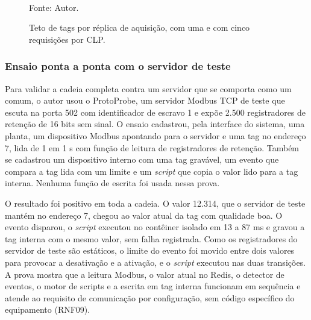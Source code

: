 \begin{figure}[H]
    \centering
    \caption{Teto de tags por réplica de aquisição, com uma e com cinco requisições por CLP.}
    \label{fig:cap7_aquisicao}
    \vspace{0.4cm}
    \vspace{0.2cm} \\
    Fonte: Autor.
\end{figure}

\subsubsection{Ensaio ponta a ponta com o servidor de teste}

\par Para validar a cadeia completa contra um servidor que se comporta como um  comum, o autor usou o ProtoProbe, um servidor Modbus TCP de teste que escuta na porta 502 com identificador de escravo 1 e expõe 2.500 registradores de retenção de 16 bits sem sinal. O ensaio cadastrou, pela interface do sistema, uma planta, um dispositivo Modbus apontando para o servidor e uma tag no endereço 7, lida de 1 em 1 s com função de leitura de registradores de retenção. Também se cadastrou um dispositivo interno com uma tag gravável, um evento que compara a tag lida com um limite e um \emph{script} que copia o valor lido para a tag interna. Nenhuma função de escrita foi usada nessa prova.

\par O resultado foi positivo em toda a cadeia. O valor 12.314, que o servidor de teste mantém no endereço 7, chegou ao valor atual da tag com qualidade boa. O evento disparou, o \emph{script} executou no contêiner isolado em 13 a 87 ms e gravou a tag interna com o mesmo valor, sem falha registrada. Como os registradores do servidor de teste são estáticos, o limite do evento foi movido entre dois valores para provocar a desativação e a ativação, e o \emph{script} executou nas duas transições. A prova mostra que a leitura Modbus, o valor atual no Redis, o detector de eventos, o motor de scripts e a escrita em tag interna funcionam em sequência e atende ao requisito de comunicação por configuração, sem código específico do equipamento (RNF09).

